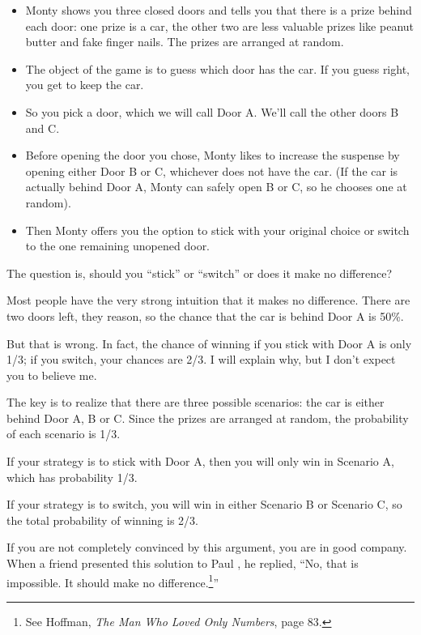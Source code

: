 \documentclass[10pt]{book}
\begin{document}
\begin{itemize}

\item Monty shows you three closed doors and tells you that there is a
  prize behind each door: one prize is a car, the other two are less
  valuable prizes like peanut butter and fake finger nails.  The
  prizes are arranged at random.

\item The object of the game is to guess which door has the car.  If
  you guess right, you get to keep the car.

\item So you pick a door, which we will call Door A.  We'll call the
  other doors B and C.

\item Before opening the door you chose, Monty likes to increase the
  suspense by opening either Door B or C, whichever does not
  have the car.  (If the car is actually behind Door A, Monty can
  safely open B or C, so he chooses one at random).

\item Then Monty offers you the option to stick with your original
  choice or switch to the one remaining unopened door.

\end{itemize}

The question is, should you ``stick'' or ``switch'' or does it
make no difference?

Most people have the very strong intuition that it makes no difference.
There are two doors left, they reason, so the chance that the car
is behind Door A is 50\%.

But that is wrong.  In fact, the chance of winning if you stick
with Door A is only 1/3; if you switch, your chances are 2/3.
I will explain why, but I don't expect you to believe me.

The key is to realize that there are three possible scenarios:
the car is either behind Door A, B or C.  Since the prizes are
arranged at random, the probability of each scenario is 1/3.

If your strategy is to stick with Door A, then you will only
win in Scenario A, which has probability 1/3.

If your strategy is to switch, you will win in either Scenario
B or Scenario C, so the total probability of winning is 2/3.

If you are not completely convinced by this argument, you are
in good company.  When a friend presented this solution to
Paul \Erdos, he replied, ``No, that is impossible.  It should
make no difference.\footnote{See Hoffman, {\em The Man Who Loved
Only Numbers}, page 83.}''
\end{document}
